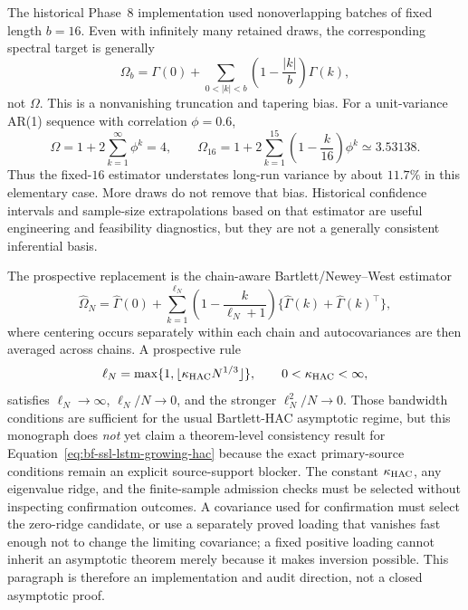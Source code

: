 The historical Phase~8 implementation used nonoverlapping batches of fixed
length $b=16$.  Even with infinitely many retained draws, the corresponding
spectral target is generally
\begin{equation}
  \Omega_b
  =\Gamma(0)+\sum_{0<|k|<b}
    \left(1-\frac{|k|}{b}\right)\Gamma(k),
  \label{eq:bf-ssl-lstm-fixed-batch-limit}
\end{equation}
not $\Omega$.  This is a nonvanishing truncation and tapering bias.  For a
unit-variance AR(1) sequence with correlation $\phi=0.6$,
\begin{equation}
  \Omega=1+2\sum_{k=1}^{\infty}\phi^k=4,
  \qquad
  \Omega_{16}=1+2\sum_{k=1}^{15}
       \left(1-\frac{k}{16}\right)\phi^k
       \simeq3.53138.
  \label{eq:bf-ssl-lstm-fixed-batch-counterexample}
\end{equation}
Thus the fixed-$16$ estimator understates long-run variance by about $11.7\%$
in this elementary case.  More draws do not remove that bias.  Historical
confidence intervals and sample-size extrapolations based on that estimator
are useful engineering and feasibility diagnostics, but they are not a
generally consistent inferential basis.

The prospective replacement is the chain-aware Bartlett/Newey--West estimator
\citep{neweywest1987,flegal2010batchmeans}
\begin{equation}
  \widehat\Omega_N
  =\widehat\Gamma(0)+\sum_{k=1}^{\ell_N}
    \left(1-\frac{k}{\ell_N+1}\right)
    \{\widehat\Gamma(k)+\widehat\Gamma(k)^\top\},
  \label{eq:bf-ssl-lstm-growing-hac}
\end{equation}
where centering occurs separately within each chain and autocovariances are
then averaged across chains.  A prospective rule
\begin{equation}
  \ell_N=\max\{1,\lfloor\kappa_{\rm HAC}N^{1/3}\rfloor\},
  \qquad 0<\kappa_{\rm HAC}<\infty,
  \label{eq:bf-ssl-lstm-hac-bandwidth}
\end{equation}
satisfies $\ell_N\rightarrow\infty$, $\ell_N/N\rightarrow0$, and the stronger
$\ell_N^2/N\rightarrow0$.  Those bandwidth conditions are sufficient for the
usual Bartlett-HAC asymptotic regime, but this monograph does \emph{not} yet
claim a theorem-level consistency result for Equation~\eqref{eq:bf-ssl-lstm-growing-hac}
because the exact primary-source conditions remain an explicit source-support
blocker.  The constant $\kappa_{\rm HAC}$, any eigenvalue ridge, and the
finite-sample admission checks must be selected without inspecting confirmation
outcomes.  A covariance used for confirmation must select the zero-ridge
candidate, or use a separately proved loading that vanishes fast enough not to
change the limiting covariance; a fixed positive loading cannot inherit an
asymptotic theorem merely because it makes inversion possible.  This paragraph is
therefore an implementation and audit direction, not a closed asymptotic proof.

